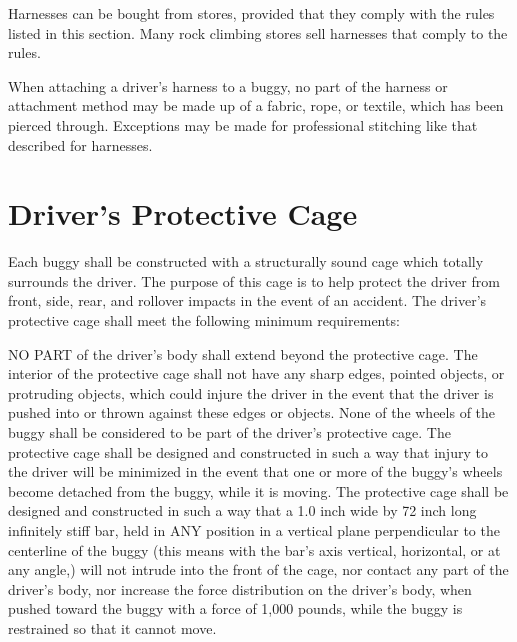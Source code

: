 	Harnesses can be bought from stores, provided that they comply with the rules listed in this section. Many rock climbing stores sell harnesses that comply to the rules.

	When attaching a driver's harness to a buggy, no part of the harness or attachment method may be made up of a fabric, rope, or textile, which has been pierced through. Exceptions may be made for professional stitching like that described for harnesses.

\section{Driver's Protective Cage}

	Each buggy shall be constructed with a structurally sound cage which totally surrounds the driver. The purpose of this cage is to help protect the driver from front, side, rear, and rollover impacts in the event of an accident. The driver's protective cage shall meet the following minimum requirements:

	NO PART of the driver's body shall extend beyond the protective cage.
	The interior of the protective cage shall not have any sharp edges, pointed objects, or protruding objects, which could injure the driver in the event that the driver is pushed into or thrown against these edges or objects.
	None of the wheels of the buggy shall be considered to be part of the driver's protective cage.
	The protective cage shall be designed and constructed in such a way that injury to the driver will be minimized in the event that one or more of the buggy's wheels become detached from the buggy, while it is moving.
	The protective cage shall be designed and constructed in such a way that a 1.0 inch wide by 72 inch long infinitely stiff bar, held in ANY position in a vertical plane perpendicular to the centerline of the buggy (this means with the bar's axis vertical, horizontal, or at any angle,) will not intrude into the front of the cage, nor contact any part of the driver's body, nor increase the force distribution on the driver's body, when pushed toward the buggy with a force of 1,000 pounds, while the buggy is restrained so that it cannot move.

